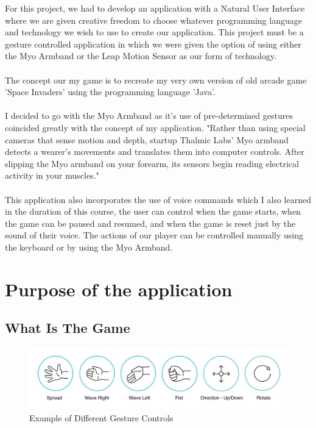 \documentclass{article}
\begin{document}
For this project, we had to develop an application with a Natural User Interface where we are given creative freedom to choose whatever programming language and technology we wish to use to create our application. This project must be a gesture controlled application in which we were given the option of using either the Myo Armband or the Leap Motion Sensor as our form of technology.\\ \\
The concept our my game is to recreate my very own version of old arcade game 'Space Invaders' using the programming language 'Java'.\\ \\
I decided to go with the Myo Armband as it's use of pre-determined gestures coincided greatly with the concept of my application. "Rather than using special cameras that sense motion and depth, startup Thalmic Labs' Myo armband detects a wearer's movements and translates them into computer controls. After slipping the Myo armband on your forearm, its sensors begin reading electrical activity in your muscles."\\ \\
This application also incorporates the use of voice commands which I also learned in the duration of this course, the user can control when the game starts, when the game can be paused and resumed, and when the game is reset just by the sound of their voice. The actions of our player can be controlled manually using the keyboard or by using the Myo Armband.

\section{Purpose of the application}

\subsection{What Is The Game}

\begin{figure}[h]
  \includegraphics[width=\textwidth]{img/gestures.jpg}
  \centering
  \caption{Example of Different Gesture Controls}
  \label{fig: Myo Armband Gesture Controls}
\end{figure}
\end{document}
